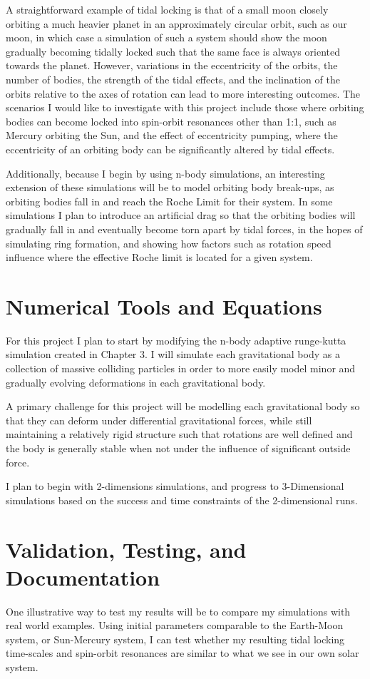 \documentclass{article}
\begin{document}
A straightforward example of tidal locking is that of a small moon closely orbiting a much heavier planet in an approximately circular orbit, such as our moon, in which case a simulation of such a system should show the moon gradually becoming tidally locked such that the same face is always oriented towards the planet. However, variations in the eccentricity of the orbits, the number of bodies, the strength of the tidal effects, and the inclination of the orbits relative to the axes of rotation can lead to more interesting outcomes. The scenarios I would like to investigate with this project include those where orbiting bodies can become locked into spin-orbit resonances other than 1:1, such as Mercury orbiting the Sun, and the effect of eccentricity pumping, where the eccentricity of an orbiting body can be significantly altered by tidal effects.

Additionally, because I begin by using n-body simulations, an interesting extension of these simulations will be to model orbiting body break-ups, as orbiting bodies fall in and reach the Roche Limit for their system. In some simulations I plan to introduce an artificial drag so that the orbiting bodies will gradually fall in and eventually become torn apart by tidal forces, in the hopes of simulating ring formation, and showing how factors such as rotation speed influence where the effective Roche limit is located for a given system.  

\section{Numerical Tools and Equations}
For this project I plan to start by modifying the n-body adaptive runge-kutta simulation created in Chapter 3. I will simulate each gravitational body as a collection of massive colliding particles in order to more easily model minor and gradually evolving deformations in each gravitational body.

A primary challenge for this project will be modelling each gravitational body so that they can deform under differential gravitational forces, while still maintaining a relatively rigid structure such that rotations are well defined and the body is generally stable when not under the influence of significant outside force.  

I plan to begin with 2-dimensions simulations, and progress to 3-Dimensional simulations based on the success and time constraints of the 2-dimensional runs. 


\section{Validation, Testing, and Documentation}
One illustrative way to test my results will be to compare my simulations with real world examples. Using initial parameters comparable to the Earth-Moon system, or Sun-Mercury system, I can test whether my resulting tidal locking time-scales and spin-orbit resonances are similar to what we see in our own solar system. 
\end{document}
